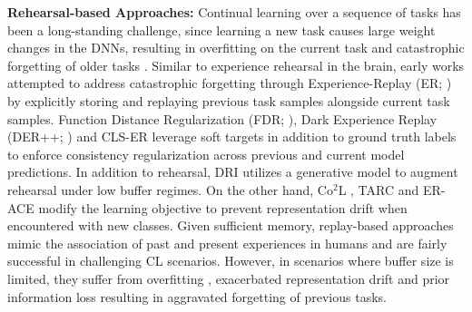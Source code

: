 \documentclass{article} %
\begin{document}
\textbf{Rehearsal-based Approaches:} Continual learning over a sequence of tasks has been a long-standing challenge, since learning a new task causes large weight changes in the DNNs, resulting in overfitting on the current task and catastrophic forgetting of older tasks \citep{parisi2019continual}. Similar to experience rehearsal in the brain, early works attempted to address catastrophic forgetting through Experience-Replay (ER; \cite{ratcliff1990connectionist, robins1995catastrophic}) by explicitly storing and replaying previous task samples alongside current task samples. Function Distance Regularization (FDR; \cite{benjamin2018measuring}), Dark Experience Replay (DER++; \cite{buzzega2020dark}) and CLS-ER \citep{arani2022learning} leverage soft targets in addition to ground truth labels to enforce consistency regularization across previous and current model predictions. In addition to rehearsal, DRI \citep{wang2022continual} utilizes a generative model to augment rehearsal under low buffer regimes.  On the other hand,  Co$^{2}$L \citep{cha2021co2l}, TARC \citep{pmlr-v199-bhat22a} and ER-ACE \citep{caccia2021new} modify the learning objective to prevent representation drift when encountered with new classes. Given sufficient memory, replay-based approaches mimic the association of past and present experiences in humans and are fairly successful in challenging CL scenarios. However, in scenarios where buffer size is limited, they suffer from overfitting \citep{bhat2022consistency}, exacerbated representation drift \citep{caccia2021reducing} and prior information loss \citep{zhang2020self} resulting in aggravated forgetting of previous tasks.
\end{document}
